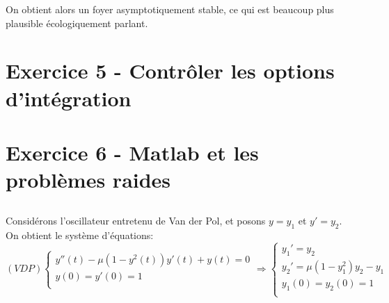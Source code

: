 \documentclass[a4paper,12pt,landscape]{article}
\begin{document}
On obtient alors un foyer asymptotiquement stable, ce qui est beaucoup plus plausible écologiquement parlant.
\newpage
\section{Exercice 5 - Contrôler les options d'intégration}
\newpage
\section{Exercice 6 - Matlab et les problèmes raides}

\subsection{}
Considérons l'oscillateur entretenu de Van der Pol, et posons $y=y_1$ et $y'=y_2$.
On obtient le système d'équations:
\[(VDP)
\left\{
\begin{array}{ll}
y''(t)-\mu(1-y^{2}(t))y'(t)+y(t)=0\\
y(0)=y'(0)=1\\
\end{array}
\right.
\Rightarrow
\left\{
\begin{array}{ll}
y_1'=y_2\\
y_2'=\mu(1-y_1^{2})y_2-y_1\\
y_1(0)=y_2(0)=1\\
\end{array}
\right.
\]
\end{document}
